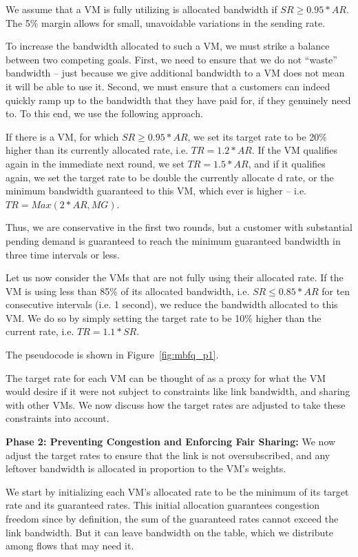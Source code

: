 We assume that a VM is fully utilizing is allocated bandwidth if $SR \geq
0.95*AR$. The 5\% margin allows for small, unavoidable variations in the sending
rate. 

To increase the bandwidth allocated to such a VM, we must strike a balance
between two competing goals. First, we need to ensure that we do not ``waste''
bandwidth -- just because we give additional bandwidth to a VM does not mean it
will be able to use it. Second, we must ensure that a customers can indeed
quickly ramp up to the bandwidth that they have paid for, if they genuinely need
to. To this end, we use the following approach. 

If there is a VM, for which $SR \geq 0.95*AR$, we set its target rate to be 20\%
higher than its currently allocated rate, i.e. $TR = 1.2*AR$.  If the VM
qualifies again in the immediate next round, we set $TR = 1.5*AR$, and if it
qualifies again, we set the target rate to be double the currently allocate d
rate, or the minimum bandwidth guaranteed to this VM, which ever is higher --
i.e. $TR = Max(2*AR, MG)$. 

Thus, we are conservative in the first two rounds, but a customer with
substantial pending demand is guaranteed to reach the minimum guaranteed
bandwidth in three time intervals or less.

Let us now consider the VMs that are not fully using their allocated rate.  If
the VM is using less than 85\% of its allocated bandwidth, i.e. $SR \leq
0.85*AR$ for ten consecutive intervals (i.e. 1 second), we reduce the bandwidth
allocated to this VM. We do so by simply setting the target rate to be 10\%
higher than the current rate, i.e. $TR = 1.1*SR$. 

The pseudocode is shown in Figure~\ref{fig:mbfq_p1}.

The target rate for each VM can be thought of as a proxy for what the VM would
desire if it were not subject to constraints like link bandwidth, and sharing
with other VMs. We now discuss how the target rates are adjusted to take these
constraints into account.

{\bf Phase 2:  Preventing Congestion and Enforcing Fair Sharing:} 
We now adjust the target rates to ensure that the link is not oversubscribed,
and any leftover bandwidth is allocated in proportion to the VM's weights.

We start by initializing each VM's allocated rate to be the minimum of its
target rate and its guaranteed rates.  This initial allocation guarantees
congestion freedom since by definition, the sum of the guaranteed rates cannot
exceed the link bandwidth.  But it can leave bandwidth on the table, which we
distribute among flows that may need it.

